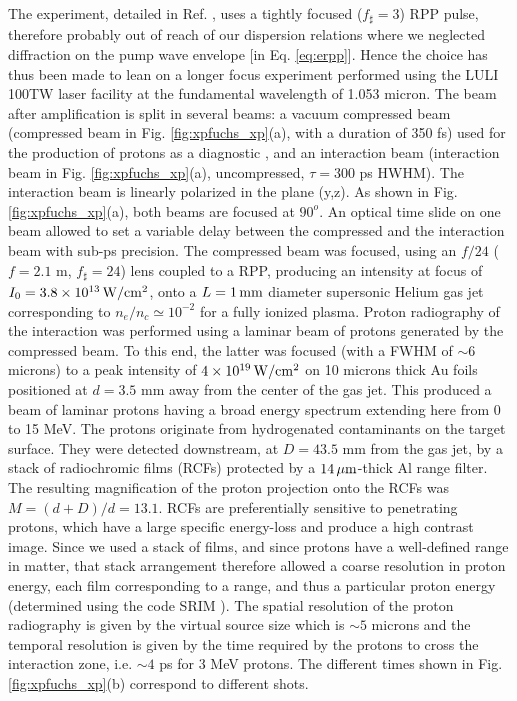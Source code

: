 \documentclass[
 reprint,
 superscriptaddress,
 amsmath,amssymb,
 aps,
]{revtex4-1}
\begin{document}
The experiment, detailed in Ref. \cite[]{PRL_Sarri_2011}, uses a tightly focused ($f_\sharp =3$) RPP pulse,  therefore probably out of reach of our dispersion relations where we neglected diffraction  on the pump wave envelope [in Eq. \eqref{eq:erpp}].
Hence the choice has thus been made to lean on 
a longer focus  experiment performed using the LULI 100TW laser facility at the fundamental wavelength of 1.053 micron. The beam after amplification is split in several beams: a vacuum compressed beam (compressed beam in Fig. \ref{fig:xpfuchs_xp}(a), with a duration of 350 fs) used for the production of protons as a diagnostic \cite{RSI_Mackinnon_2004}, and an interaction beam (interaction beam in Fig. \ref{fig:xpfuchs_xp}(a),  uncompressed, $\tau=300$ ps HWHM). The interaction beam is linearly polarized in the plane (y,z). As shown in 
Fig. \ref{fig:xpfuchs_xp}(a), both beams are focused at $90^o$. An optical time slide on one beam allowed to set a variable delay between the compressed  and the interaction beam with sub-ps precision. The compressed beam was focused, using an $f/24$ ($f=2.1$ m, $f_\sharp=24$)  lens coupled to a RPP, producing an intensity at focus of $I_0=3.8\times 10^{13}\, \rm W/cm^2$, onto a $L=1\,\rm mm$ diameter supersonic Helium gas jet corresponding to  $n_e/n_c\simeq 10^{-2}$ for a fully ionized plasma. 
Proton radiography of the interaction was performed using a laminar beam of protons generated by the compressed beam.
To this end, the latter was focused (with a FWHM of $\sim 6$ microns) to a peak intensity of $4\times 10^{19}\, \rm W/cm^2$ on 10 microns thick Au foils positioned at $d=3.5$ mm away from the center of the gas jet. This produced  \cite{PRL_Snavely_2000} a beam of laminar protons having a broad energy spectrum extending here from 0 to 15 MeV. The protons originate from hydrogenated contaminants on the target surface. They were detected downstream, at $D=43.5$ mm from the gas jet, by a stack of radiochromic films (RCFs) \cite{Bolton_2014}  protected by a $14\, \rm \mu m$-thick Al range filter. The resulting magniﬁcation of the proton projection onto the RCFs was $M=(d+D)/d =13.1$. RCFs are preferentially sensitive to penetrating protons, which have a large specific energy-loss and produce a high contrast image. Since we used a stack of films, and since protons have a well-defined range in matter, that stack arrangement therefore allowed a coarse resolution in proton energy, each film corresponding to a range, and thus a particular proton energy (determined using the code SRIM \cite{Ziegler_2010}). 
The spatial resolution of the proton radiography is given by the virtual source size which is $\sim 5$ microns \cite{PRL_Cowan_2004} and the temporal resolution is given by the time required by the protons to cross the interaction zone, i.e. $\sim 4$ ps for $3$ MeV protons. The different times shown in Fig. \ref{fig:xpfuchs_xp}(b) correspond to different shots. 
\end{document}
